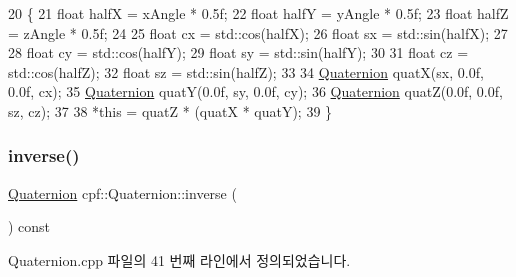 \begin{DoxyCode}
20                                                                               \{
21         \textcolor{keywordtype}{float} halfX = xAngle * 0.5f;
22         \textcolor{keywordtype}{float} halfY = yAngle * 0.5f;
23         \textcolor{keywordtype}{float} halfZ = zAngle * 0.5f;
24 
25         \textcolor{keywordtype}{float} cx = std::cos(halfX);
26         \textcolor{keywordtype}{float} sx = std::sin(halfX);
27 
28         \textcolor{keywordtype}{float} cy = std::cos(halfY);
29         \textcolor{keywordtype}{float} sy = std::sin(halfY);
30 
31         \textcolor{keywordtype}{float} cz = std::cos(halfZ);
32         \textcolor{keywordtype}{float} sz = std::sin(halfZ);
33 
34         \hyperlink{classcpf_1_1_quaternion_aae3cc98fcdb7a419a29db4ee988972bc}{Quaternion} quatX(sx, 0.0f, 0.0f, cx);
35         \hyperlink{classcpf_1_1_quaternion_aae3cc98fcdb7a419a29db4ee988972bc}{Quaternion} quatY(0.0f, sy, 0.0f, cy);
36         \hyperlink{classcpf_1_1_quaternion_aae3cc98fcdb7a419a29db4ee988972bc}{Quaternion} quatZ(0.0f, 0.0f, sz, cz);
37 
38         *\textcolor{keyword}{this} = quatZ * (quatX * quatY);
39     \}
\end{DoxyCode}
\mbox{\label{classcpf_1_1_quaternion_a0cae7c07c095413e9eaf91dc7400ace2}} 
\subsubsection{\texorpdfstring{inverse()}{inverse()}}
{\footnotesize\ttfamily \hyperlink{classcpf_1_1_quaternion}{Quaternion} cpf\+::\+Quaternion\+::inverse (\begin{DoxyParamCaption}{ }\end{DoxyParamCaption}) const}



Quaternion.\+cpp 파일의 41 번째 라인에서 정의되었습니다.


